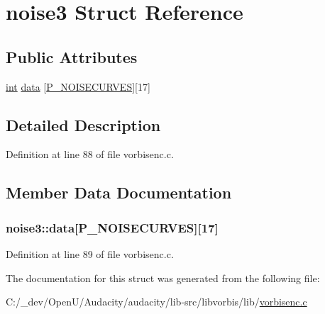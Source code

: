 \hypertarget{structnoise3}{}\section{noise3 Struct Reference}
\label{structnoise3}
\subsection*{Public Attributes}
\begin{DoxyCompactItemize}
\item 
\hyperlink{xmltok_8h_a5a0d4a5641ce434f1d23533f2b2e6653}{int} \hyperlink{structnoise3_a43d278adceb5aa18af0b06faf51aa544}{data} \mbox{[}\hyperlink{psy_8h_a179ea3e4fa2cdb1ef235e922ea51405a}{P\+\_\+\+N\+O\+I\+S\+E\+C\+U\+R\+V\+ES}\mbox{]}\mbox{[}17\mbox{]}
\end{DoxyCompactItemize}


\subsection{Detailed Description}


Definition at line 88 of file vorbisenc.\+c.



\subsection{Member Data Documentation}
\subsubsection[{\texorpdfstring{data}{data}}]{ noise3\+::data\mbox{[}{\bf P\+\_\+\+N\+O\+I\+S\+E\+C\+U\+R\+V\+ES}\mbox{]}\mbox{[}17\mbox{]}}\hypertarget{structnoise3_a43d278adceb5aa18af0b06faf51aa544}{}\label{structnoise3_a43d278adceb5aa18af0b06faf51aa544}


Definition at line 89 of file vorbisenc.\+c.



The documentation for this struct was generated from the following file\+:\begin{DoxyCompactItemize}
\item 
C\+:/\+\_\+dev/\+Open\+U/\+Audacity/audacity/lib-\/src/libvorbis/lib/\hyperlink{vorbisenc_8c}{vorbisenc.\+c}\end{DoxyCompactItemize}
